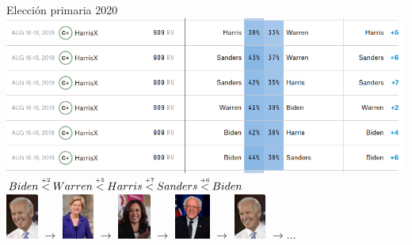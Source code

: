 \documentclass[bigger]{beamer}
\begin{document}
\begin{frame}[label={sec:orgb8a1321}]{Elección primaria 2020}
\flushright
\includegraphics[width=.95\textwidth]{./pics/cycle-2019-dem-primary-zoom.png} \\[0pt]
\bigskip \centering
\color{black}\(Biden \stackrel{\mathclap{\tiny\mbox{+2}}}{<} 
             Warren \stackrel{\mathclap{\tiny\mbox{+5}}}{<} 
             Harris \stackrel{\mathclap{\tiny\mbox{+7}}}{<} 
             Sanders \stackrel{\mathclap{\tiny\mbox{+6}}}{<} 
             Biden\) \\[0pt]
\bigskip
\includegraphics[height=1.5cm]{./pics/biden.png} \(\rightarrow\)
\includegraphics[height=1.5cm]{./pics/warren.png} \(\rightarrow\)
\includegraphics[height=1.5cm]{./pics/harris.png} \(\rightarrow\)
\includegraphics[height=1.5cm]{./pics/sanders.png} \(\rightarrow\)
\includegraphics[height=1.5cm]{./pics/biden.png} \(\rightarrow \ldots\)
\end{frame}
\end{document}
